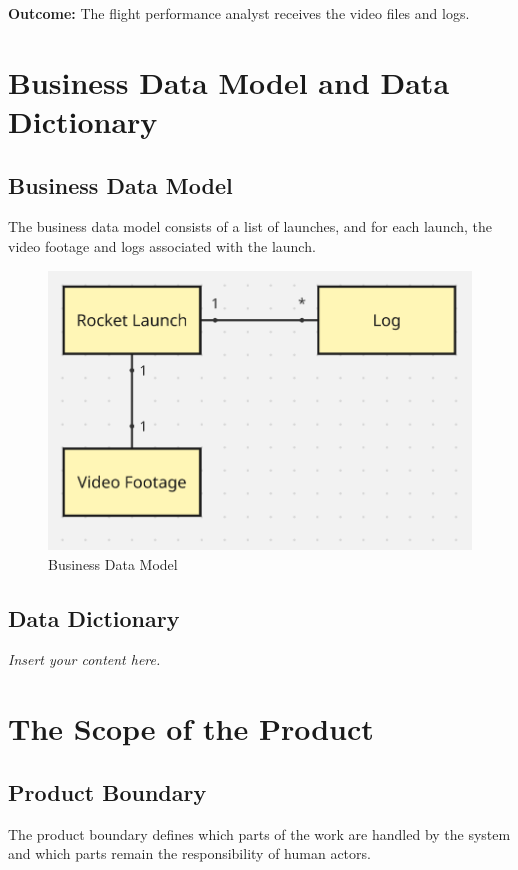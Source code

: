 \documentclass[12pt]{article}
\newcommand{\lips}{\textit{Insert your content here.}}
\begin{document}
\textbf{Outcome:} The flight performance analyst receives the video files and logs.

\section{Business Data Model and Data Dictionary}
\subsection{Business Data Model}

The business data model consists of a list of launches, and for each launch,
the video footage and logs associated with the launch.

\FloatBarrier
\begin{figure}[h]
  \centering
  \includegraphics[width=\textwidth,height=\textheight,keepaspectratio]{../Images/business_data_model.png}
  \caption{Business Data Model}
  \label{img:business-data-model}
\end{figure}
\FloatBarrier

\subsection{Data Dictionary}
\lips

\section{The Scope of the Product}
\subsection{Product Boundary}

The product boundary defines which parts of the work are handled by the system
and which parts remain the responsibility of human actors.
\end{document}
